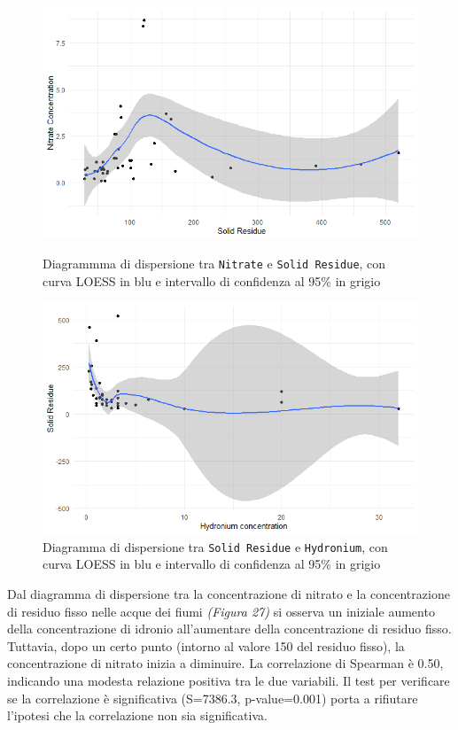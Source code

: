 \documentclass{article} %
\begin{document}
\begin{figure}[H]
    \centering
    \begin{minipage}{0.49\textwidth}
        \centering
        \includegraphics[width=\textwidth]{immagini/sr_nitrate.png}
        \captionsetup{justification=centering}
        \caption{Diagrammma di dispersione tra \texttt{Nitrate} e \texttt{Solid Residue}, con curva LOESS in blu e intervallo di confidenza al 95\% in grigio}
    \end{minipage}
    \hfill
    \begin{minipage}{0.49\textwidth}
        \centering
        \includegraphics[width=\textwidth]{immagini/sr_hy.png}
        \captionsetup{justification=centering}
        \caption{Diagramma di dispersione tra \texttt{Solid Residue} e \texttt{Hydronium}, con curva LOESS in blu e intervallo di confidenza al 95\% in grigio}
    \end{minipage}
\end{figure}

Dal diagramma di dispersione tra la concentrazione di nitrato e la concentrazione di residuo fisso nelle acque dei fiumi \textit{(Figura 27)} si osserva un iniziale aumento della concentrazione di idronio all'aumentare della concentrazione di residuo fisso. Tuttavia, dopo un certo punto (intorno al valore 150 del residuo fisso), la concentrazione di nitrato inizia a diminuire.
La correlazione di Spearman è 0.50, indicando una modesta relazione positiva tra le due variabili. 
Il test per verificare se la correlazione è significativa (S=7386.3, p-value=0.001) porta a rifiutare l'ipotesi che la correlazione non sia significativa.
\end{document}
